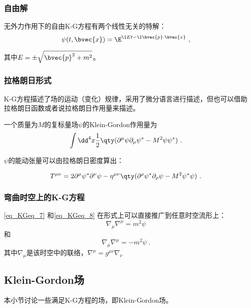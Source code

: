 \subsubsection{自由解}

无外力作用下的自由K-G方程有两个线性无关的特解：
\begin{equation}
\psi(t, \bvec{x}) = \E^{\I Et-\I \bvec{p}\cdot\bvec{x}}~,
\end{equation}

其中$E=\pm\sqrt{\bvec{p}^2+m^2}$。





\subsubsection{拉格朗日形式}


K-G方程描述了场的运动（变化）规律，采用了微分语言进行描述，但也可以借助拉格朗日函数或者说拉格朗日作用量来描述。

一个质量为$M$的复标量场$\psi$的Klein-Gordon作用量为
\begin{equation}
\int {\dd}^4 x \frac{1}{2}\qty(\partial^\mu\psi\partial_\mu\psi^*-M^2\psi\psi^*)~.
\end{equation}

$\psi$的能动张量可以由拉格朗日密度算出：

\begin{equation}
T^{\mu\nu} = 2\partial^\mu\psi^*\partial^\nu\psi-\eta^{\mu\nu}\qty(\partial^\rho\psi^*\partial_\rho\psi-M^2\psi^*\psi)~.
\end{equation}


\subsubsection{弯曲时空上的K-G方程}

\autoref{eq_KGeq_7} 和\autoref{eq_KGeq_8} 在形式上可以直接推广到任意时空流形上：
\begin{equation}
\nabla_\mu\nabla^\mu=m^2\psi
\end{equation}
和
\begin{equation}
\nabla_\mu\nabla^\mu=-m^2\psi~.
\end{equation}
其中$\nabla_\mu$是该时空中的联络，$\nabla^\mu=g^{\mu\nu}\nabla_\nu$





\subsection{Klein-Gordon场}\label{sub_KGeq_1}

本小节讨论一些满足K-G方程的场，即Klein-Gordon场。


























